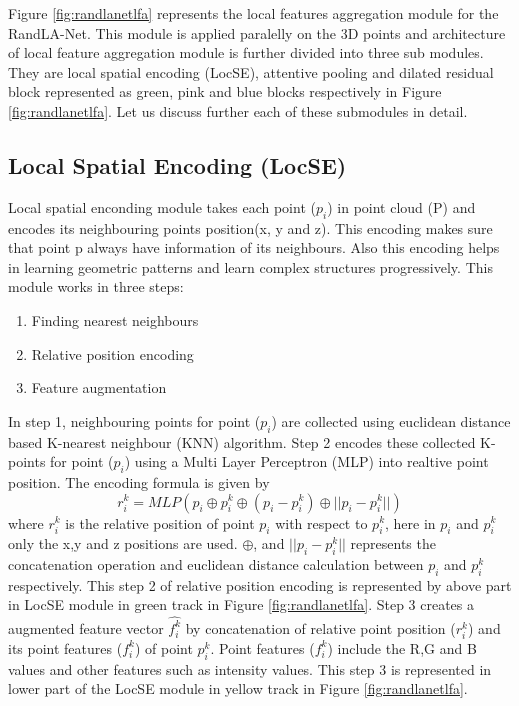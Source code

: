 Figure \ref{fig:randlanetlfa} represents the local features aggregation module for the RandLA-Net.
This module is applied paralelly on the 3D points and architecture of local feature aggregation module is further divided into three sub modules.
They are local spatial encoding (LocSE), attentive pooling and dilated residual block represented as green, pink and blue blocks respectively in Figure \ref{fig:randlanetlfa}.
Let us discuss further each of these submodules in detail.

\subsection{Local Spatial Encoding (LocSE)}
Local spatial enconding module takes each point ($p_i$) in point cloud (P) and encodes its neighbouring points position(x, y and z).
This encoding makes sure that point p always have information of its neighbours.
Also this encoding helps in learning geometric patterns and learn complex structures progressively.
This module works in three steps:
\begin{enumerate}
    \item Finding nearest neighbours
    \item Relative position encoding
    \item Feature augmentation
\end{enumerate}

In step 1, neighbouring points for point ($p_i$) are collected using euclidean distance based K-nearest neighbour (KNN) algorithm.
Step 2 encodes these collected K-points for point ($p_i$) using a Multi Layer Perceptron (MLP) into realtive point position. The encoding formula is given by
$$
r_i^k = MLP(p_i \oplus p_i^k \oplus (p_i - p_i^k) \oplus ||p_i-p_i^k||)
$$
where $r_i^k$ is the relative position of point $p_i$ with respect to $p_i^k$, here in $p_i$ and $p_i^k$ only the x,y and z positions are used.
$\oplus$, and $||p_i-p_i^k||$ represents the concatenation operation and euclidean distance calculation between $p_i$ and $p_i^k$ respectively.
This step 2 of relative position encoding is represented by above part in LocSE module in green track in Figure \ref{fig:randlanetlfa}.
Step 3 creates a augmented feature vector $\hat{f_i^k}$ by concatenation of relative point position ($r_i^k$) and its point features ($f_i^k$) of point $p_i^k$.
Point features ($f_i^k$) include the R,G and B values and other features such as intensity values.
This step 3 is represented in lower part of the LocSE module in yellow track in Figure \ref{fig:randlanetlfa}.

